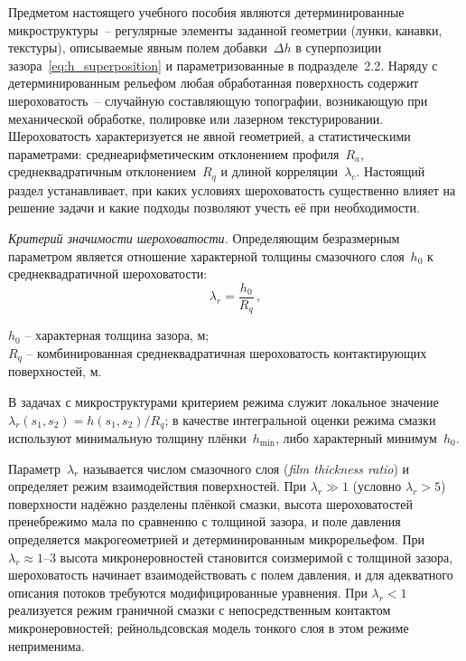 Предметом настоящего учебного пособия являются детерминированные
микроструктуры~-- регулярные элементы заданной геометрии (лунки,
канавки, текстуры), описываемые явным полем добавки~$\Delta h$
в суперпозиции зазора~\eqref{eq:h_superposition} и параметризованные
в подразделе~2.2. Наряду с детерминированным рельефом любая
обработанная поверхность содержит шероховатость~-- случайную
составляющую топографии, возникающую при механической обработке,
полировке или лазерном текстурировании. Шероховатость
характеризуется не явной геометрией, а статистическими параметрами:
среднеарифметическим отклонением профиля~$R_a$,
среднеквадратичным отклонением~$R_q$ и длиной
корреляции~$\lambda_c$. Настоящий раздел устанавливает, при каких
условиях шероховатость существенно влияет на решение задачи
и какие подходы позволяют учесть её при необходимости.

\textit{Критерий значимости шероховатости.}
Определяющим безразмерным параметром является отношение
характерной толщины смазочного слоя~$h_0$ к среднеквадратичной
шероховатости:
\begin{equation}
  \lambda_r = \frac{h_0}{R_q}\,,
  \label{eq:lambda_roughness}
\end{equation}
\begin{conditions}
$h_0$ -- характерная толщина зазора, м;\\
$R_q$ -- комбинированная среднеквадратичная шероховатость
контактирующих поверхностей, м.
\end{conditions}
В задачах с микроструктурами критерием режима служит локальное значение $\lambda_r(s_1, s_2) = h(s_1, s_2)/R_q$; в качестве интегральной оценки режима смазки используют минимальную толщину плёнки~$h_{\min}$, либо характерный минимум~$h_0$.

Параметр~$\lambda_r$ называется числом смазочного слоя
(\textit{film thickness ratio}) и определяет режим взаимодействия
поверхностей. При $\lambda_r \gg 1$ (условно $\lambda_r > 5$)
поверхности надёжно разделены плёнкой смазки, высота
шероховатостей пренебрежимо мала по сравнению с толщиной зазора,
и поле давления определяется макрогеометрией и детерминированным
микрорельефом. При $\lambda_r \approx 1\text{--}3$ высота
микронеровностей становится соизмеримой с толщиной зазора,
шероховатость начинает взаимодействовать с полем давления, и для
адекватного описания потоков требуются модифицированные уравнения.
При $\lambda_r < 1$ реализуется режим граничной смазки
с непосредственным контактом микронеровностей; рейнольдсовская
модель тонкого слоя в этом режиме неприменима.

